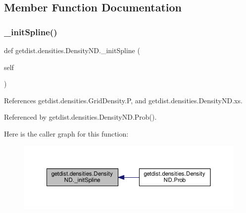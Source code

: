 \subsection{Member Function Documentation}
\mbox{\label{classgetdist_1_1densities_1_1DensityND_a797109f7fd88118c7faa8157f5e71a70}} 
\subsubsection{\texorpdfstring{\+\_\+init\+Spline()}{\_initSpline()}}
{\footnotesize\ttfamily def getdist.\+densities.\+Density\+N\+D.\+\_\+init\+Spline (\begin{DoxyParamCaption}\item[{}]{self }\end{DoxyParamCaption})\hspace{0.3cm}{\ttfamily [private]}}



References getdist.\+densities.\+Grid\+Density.\+P, and getdist.\+densities.\+Density\+N\+D.\+xs.



Referenced by getdist.\+densities.\+Density\+N\+D.\+Prob().

Here is the caller graph for this function\+:
\nopagebreak
\begin{figure}[H]
\begin{center}
\leavevmode
\includegraphics[width=350pt]{classgetdist_1_1densities_1_1DensityND_a797109f7fd88118c7faa8157f5e71a70_icgraph}
\end{center}
\end{figure}
\mbox{\label{classgetdist_1_1densities_1_1DensityND_a3fb464e026c38d7c6d6b7ae399f6ebfa}} 
